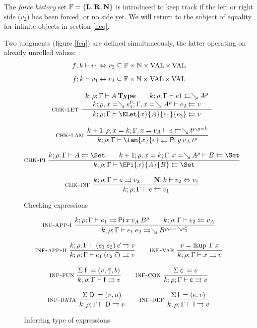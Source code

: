 The \emph{force history} set $ \mathbb{F} = \{\mathbf{L}, \mathbf{R}, \mathbf{N} \} $ is introduced to keep track if the left or right side ($v_2$) has been forced, or no side yet.
We will return to the subject of equality for infinite objects in section \ref{heq}.

Two judgments (figure \ref{feq}) are defined simultaneously, the latter operating on already unrolled values:
\[f;k\vdash v_1\Leftrightarrow v_2 \subseteq \mathbb{F} \times \mathbb{N} \times \operatorname{VAL} \times \operatorname{VAL} \]
\[f;k\vdash v_1{\:\leftrightarrow\:}v_2 \subseteq \mathbb{F} \times \mathbb{N} \times\operatorname{VAL} \times \operatorname{VAL} \]

\begin{figure}[htp]

\begin{gather*}
\ndru{\chklet}
{
\IsType{k}{\rho}{\Gamma}{A}
\qquad
\Check{k}{\rho}{\Gamma}{e1}{\wh \cl{A}{\rho}}
}
{
\Check{k}{\ins{\rho}{x}{\wh \cl{e_1}{\rho}}}{\ins{\Gamma}{x}{\wh \cl{A}{\rho}}}{e_2}{v}
}
{\Check{k}{\rho}{\Gamma}{\ELet{x}{A}{e_1}{e_2}}{v}}
\\[2ex]
\nru{\chklam}
{\Check{k+1}{\ins{\rho}{x}{k}}{\ins{\Gamma}{x}{v_A}}{e}{\wh \cl{t}{\ins{\rho}{y}{k}}}}
{\Check{k}{\rho}{\Gamma}{\lam{x}{e}}{\vpi \: y \: v_A \: \cl{t}{\rho}}}
\\[2ex]
\nru{\chkpi}
{\Check{k}{\rho}{\Gamma}{A}{\Set}
\qquad
\Check{k+1}{\ins{\rho}{x}{k}}{\ins{\Gamma}{x}{\wh \cl{A}{\rho}}}{B}{\Set}
}
{\Check{k}{\rho}{\Gamma}{\EPi{x}{A}{B}}{\Set}}
\\[2ex]
\nru{\chkinf}
{\Infer{k}{\rho}{\Gamma}{e}{v_2}
\qquad
{\EqVal{\nF}{k}{v_2}{v_1}}} 
{\Check{k}{\rho}{\Gamma}{e}{v_1}}
\end{gather*}
\caption{Checking expressions}
\label{fcheck}
\end{figure}

\begin{figure}[htp]
\begin{gather*}
\mbox{\sc inf-app-i}\ \dfrac{k;\rho;\Gamma\vdash e_1\rightrightarrows\mathsf{Pi} \: x \: v_A \: B^{\rho}
\qquad k;\rho;\Gamma\vdash e_2\leftleftarrows v_A}{k;\rho;\Gamma\vdash e_1 \: e_2\rightrightarrows\searrow B^{\rho,x=\searrow e_2^{\rho}}}
\\[2ex]
\mbox{\sc inf-app-ii}\ \dfrac{k;\rho;\Gamma\vdash(e_1 \: e_2)\:\vec{e}\rightrightarrows v}{k;\rho;\Gamma\vdash e_1 \: (e_2 \: \vec{e})\rightrightarrows v}
\qquad
\mbox{\sc inf-var}\ \dfrac{v = \operatorname{lkup} \: \Gamma \: x }{k;\rho;\Gamma\vdash x\rightrightarrows v}
\\[2ex]
\mbox{\sc inf-fun}\ \dfrac{\Sigma \: \mathsf{f} \: = (v,\vec{\gamma},b) }{k;\rho;\Gamma\vdash\mathsf{f}\rightrightarrows v}
\qquad
\mbox{\sc inf-con}\ \dfrac{\Sigma \: \mathsf{c} \: = v}{k;\rho;\Gamma\vdash\mathsf{c}\rightrightarrows v}
\\[2ex] 
\mbox{\sc inf-data}\ \dfrac{\Sigma \: \mathsf{D} \: = (v,n)}{k;\rho;\Gamma\vdash\mathsf{D}\rightrightarrows v} 
\qquad
\mbox{\sc inf-def}\ \dfrac{\Sigma \: \mathsf{l} \: = (e,v)}{k;\rho;\Gamma\vdash\mathsf{l}\rightrightarrows v}
\end{gather*}
\caption{Inferring type of expressions}
\label{finf}
\end{figure}

